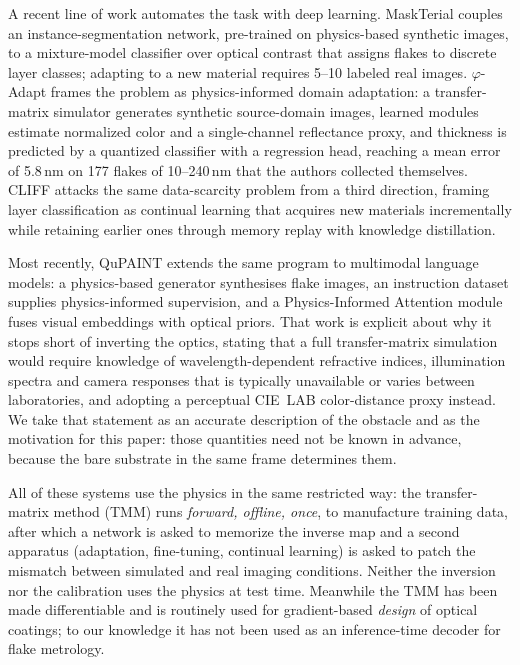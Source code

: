 \documentclass[10pt]{article}
\begin{document}
A recent line of work automates the task with deep learning. MaskTerial \cite{uslu2024maskterial} couples an instance-segmentation network, pre-trained on physics-based synthetic images, to a mixture-model classifier over optical contrast that assigns flakes to discrete layer classes; adapting to a new material requires 5--10 labeled real images. $\varphi$-Adapt \cite{phiadapt2025} frames the problem as physics-informed domain adaptation: a transfer-matrix simulator generates synthetic source-domain images, learned modules estimate normalized color and a single-channel reflectance proxy, and thickness is predicted by a quantized classifier with a regression head, reaching a mean error of 5.8\,nm on 177 flakes of 10--240\,nm that the authors collected themselves. CLIFF \cite{cliff2026} attacks the same data-scarcity problem from a third direction, framing layer classification as continual learning that acquires new materials incrementally while retaining earlier ones through memory replay with knowledge distillation.

Most recently, QuPAINT \cite{qupaint2026} extends the same program to multimodal language models: a physics-based generator synthesises flake images, an instruction dataset supplies physics-informed supervision, and a Physics-Informed Attention module fuses visual embeddings with optical priors. That work is explicit about why it stops short of inverting the optics, stating that a full transfer-matrix simulation would require knowledge of wavelength-dependent refractive indices, illumination spectra and camera responses that is typically unavailable or varies between laboratories, and adopting a perceptual CIE~LAB color-distance proxy instead. We take that statement as an accurate description of the obstacle and as the motivation for this paper: those quantities need not be known in advance, because the bare substrate in the same frame determines them.

All of these systems use the physics in the same restricted way: the transfer-matrix method (TMM) runs \emph{forward, offline, once}, to manufacture training data, after which a network is asked to memorize the inverse map and a second apparatus (adaptation, fine-tuning, continual learning) is asked to patch the mismatch between simulated and real imaging conditions. Neither the inversion nor the calibration uses the physics at test time. Meanwhile the TMM has been made differentiable \cite{byrnes2016,luce2022} and is routinely used for gradient-based \emph{design} of optical coatings; to our knowledge it has not been used as an inference-time decoder for flake metrology.
\end{document}
